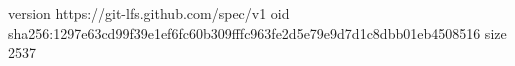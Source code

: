 version https://git-lfs.github.com/spec/v1
oid sha256:1297e63cd99f39e1ef6fc60b309fffc963fe2d5e79e9d7d1c8dbb01eb4508516
size 2537
